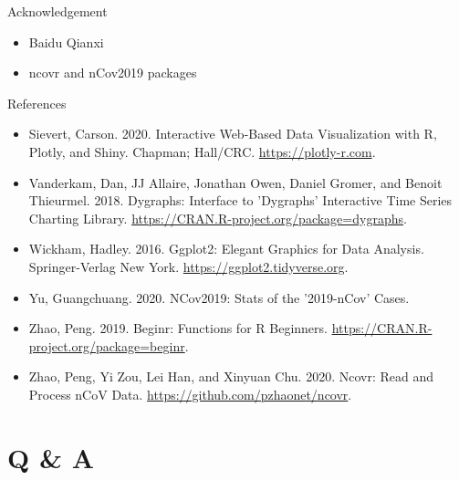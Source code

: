 \documentclass[10pt,ignorenonframetext,aspectratio=169,notes=hide,]{beamer}
\providecommand{\tightlist}{%
  \setlength{\itemsep}{0pt}\setlength{\parskip}{0pt}}
\begin{document}
\begin{frame}{Acknowledgement}
\protect\hypertarget{acknowledgement}{}

\begin{itemize}
\tightlist
\item
  Baidu Qianxi
\item
  ncovr and nCov2019 packages
\end{itemize}

\end{frame}

\begin{frame}{References}
\protect\hypertarget{references}{}

\begin{itemize}
\item
  Sievert, Carson. 2020. Interactive Web-Based Data Visualization with R, Plotly, and Shiny. Chapman; Hall/CRC. \url{https://plotly-r.com}.
\item
  Vanderkam, Dan, JJ Allaire, Jonathan Owen, Daniel Gromer, and Benoit Thieurmel. 2018. Dygraphs: Interface to 'Dygraphs' Interactive Time Series Charting Library. \url{https://CRAN.R-project.org/package=dygraphs}.
\item
  Wickham, Hadley. 2016. Ggplot2: Elegant Graphics for Data Analysis. Springer-Verlag New York. \url{https://ggplot2.tidyverse.org}.
\item
  Yu, Guangchuang. 2020. NCov2019: Stats of the '2019-nCov' Cases.
\item
  Zhao, Peng. 2019. Beginr: Functions for R Beginners. \url{https://CRAN.R-project.org/package=beginr}.
\item
  Zhao, Peng, Yi Zou, Lei Han, and Xinyuan Chu. 2020. Ncovr: Read and Process nCoV Data. \url{https://github.com/pzhaonet/ncovr}.
\end{itemize}

\end{frame}

\hypertarget{q-a}{%
\section{Q \& A}\label{q-a}}
\end{document}
